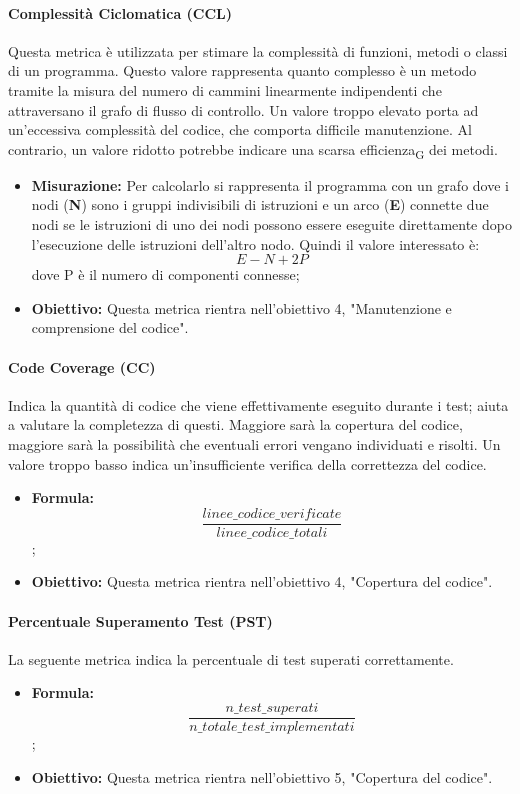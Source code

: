 	\paragraph{Complessità Ciclomatica (CCL)}
	Questa metrica è utilizzata per stimare la complessità di funzioni, metodi o classi di un programma. Questo valore rappresenta quanto complesso è un metodo tramite la misura del numero di cammini linearmente indipendenti che attraversano il grafo di flusso di controllo. Un valore troppo elevato porta ad un'eccessiva complessità del codice, che comporta difficile manutenzione. Al contrario, un valore ridotto potrebbe indicare una scarsa efficienza\textsubscript{G} dei metodi.
	\begin{itemize}
		\item \textbf{Misurazione:}  Per calcolarlo si rappresenta il programma con un grafo dove i  nodi (\textbf{N}) sono i gruppi indivisibili di istruzioni e un arco (\textbf{E}) connette due nodi se le istruzioni di uno dei nodi possono essere eseguite direttamente dopo l'esecuzione delle istruzioni dell'altro nodo. Quindi il valore interessato è:
		\[E-N+2P\]
		dove P è il numero di componenti connesse;
		\item \textbf{Obiettivo:} Questa metrica rientra nell'obiettivo 4, "Manutenzione e comprensione del codice".
	\end{itemize}
	\paragraph{Code Coverage (CC)}
	Indica la quantità di codice che viene effettivamente eseguito durante i test; aiuta a valutare la completezza di questi. Maggiore sarà la copertura del codice, maggiore sarà la possibilità che eventuali errori vengano individuati e risolti. Un valore troppo basso indica un'insufficiente verifica della correttezza del codice.
	\begin{itemize}
		\item \textbf{Formula:} \[\frac{linee\_codice\_verificate}{linee\_codice\_totali}\];
		\item \textbf{Obiettivo:} Questa metrica rientra nell'obiettivo 4, "Copertura del codice".
	\end{itemize}
	
	
	\paragraph{Percentuale Superamento Test (PST)}
	La seguente metrica indica la percentuale di test superati correttamente.
	\begin{itemize}
		\item \textbf{Formula:} \[\frac{n\_test\_superati}{n\_totale\_test\_implementati}\];
		\item \textbf{Obiettivo:} Questa metrica rientra nell'obiettivo 5, "Copertura del codice".
	\end{itemize}
	
